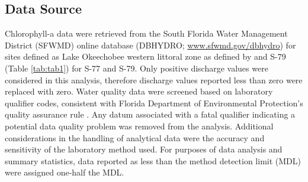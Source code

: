 \documentclass[]{interact}
\theoremstyle{plain}%
\theoremstyle{definition}
\theoremstyle{remark}
\begin{document}
\hypertarget{data-source}{%
\subsection{Data Source}\label{data-source}}

Chlorophyll-a data were retrieved from the South Florida Water
Management District (SFWMD) online database (DBHYDRO;
\url{www.sfwmd.gov/dbhydro}) for sites defined as Lake Okeechobee
western littoral zone as defined by \citet{walker_draft_2020} and S-79
(Table \ref{tab:tab1}) for S-77 and S-79. Only positive discharge values
were considered in this analysis, therefore discharge values reported
less than zero were replaced with zero. Water quality data were screened
based on laboratory qualifier codes, consistent with Florida Department
of Environmental Protection's quality assurance rule
\citep{florida_administrative_code_chapter_2008}. Any datum associated
with a fatal qualifier indicating a potential data quality problem was
removed from the analysis. Additional considerations in the handling of
analytical data were the accuracy and sensitivity of the laboratory
method used. For purposes of data analysis and summary statistics, data
reported as less than the method detection limit (MDL) were assigned
one-half the MDL.

\providecommand{\docline}[3]{\noalign{\global\setlength{\arrayrulewidth}{#1}}\arrayrulecolor[HTML]{#2}\cline{#3}}

\setlength{\tabcolsep}{2pt}

\renewcommand*{\arraystretch}{1.5}
\end{document}
